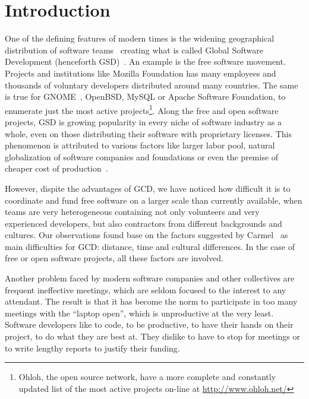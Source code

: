 \documentclass[letterpaper]{article}
\newcommand{\indraftnote}[1]{\textcolor{blue}{\texttt{\footnotesize[#1]}}}
\newcommand{\todo}[1]{\indraftnote{todo: #1}}
\begin{document}


\section{Introduction}

One of the defining features of modern times is the widening
geographical distribution of software teams~\cite{last2003} creating
what is called Global Software Development (henceforth
GSD)~\cite{german2003}. An example is the free software
movement. Projects and institutions like Mozilla Foundation has many
employees and thousands of voluntary developers distributed around
many countries. The same is true for GNOME~\cite{german2003}, OpenBSD,
MySQL or Apache Software Foundation, to enumerate just the most active
projects\footnote{Ohloh, the open source network, have a more complete
  and constantly updated list of the most active projects on-line at
  \url{http://www.ohloh.net/}}. Along the free and open software
projects, GSD is growing popularity in every niche of software
industry as a whole, even on those distributing their software with
proprietary licenses. This phenomenon is attributed to various factors
like larger labor pool, natural globalization of software companies
and foundations or even the premise of cheaper cost of
production~\cite{komi2005}.

However, dispite the advantages of GCD, we have noticed how
difficult it is to coordinate and fund free software on a larger scale
than currently available, when teams are very heterogeneous containing
not only volunteers and very experienced developers, but also
contractors from different backgrounds and cultures. Our observations
found base on the factors suggested by Carmel~\cite{carmel1999} as
main difficulties for GCD: distance, time and cultural differences. In
the case of free or open software projects, all these factors are
involved.

Another problem faced by modern software companies and other
collectives are frequent ineffective meetings, which are seldom
focused to the interest to any attendant. The result is that it has
become the norm to participate in too many meetings with the ``laptop
open'', which is unproductive at the very least. Software developers
like to code, to be productive, to have their hands on their project,
to do what they are best at. They dislike to have to stop for meetings
or to write lengthy reports to justify their funding.
\end{document}
